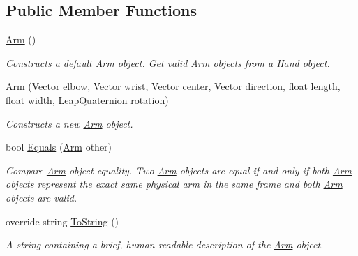 \subsection*{Public Member Functions}
\begin{DoxyCompactItemize}
\item 
\mbox{\hyperlink{class_leap_1_1_arm_ad59034da309d7065dd319774bb3907f3}{Arm}} ()
\begin{DoxyCompactList}\small\item\em Constructs a default \mbox{\hyperlink{class_leap_1_1_arm}{Arm}} object. Get valid \mbox{\hyperlink{class_leap_1_1_arm}{Arm}} objects from a \mbox{\hyperlink{class_leap_1_1_hand}{Hand}} object. \end{DoxyCompactList}\item 
\mbox{\hyperlink{class_leap_1_1_arm_a701ad9cfa92cdfdf206aaf5a43eaac43}{Arm}} (\mbox{\hyperlink{struct_leap_1_1_vector}{Vector}} elbow, \mbox{\hyperlink{struct_leap_1_1_vector}{Vector}} wrist, \mbox{\hyperlink{struct_leap_1_1_vector}{Vector}} center, \mbox{\hyperlink{struct_leap_1_1_vector}{Vector}} direction, float length, float width, \mbox{\hyperlink{struct_leap_1_1_leap_quaternion}{Leap\+Quaternion}} rotation)
\begin{DoxyCompactList}\small\item\em Constructs a new \mbox{\hyperlink{class_leap_1_1_arm}{Arm}} object. \end{DoxyCompactList}\item 
bool \mbox{\hyperlink{class_leap_1_1_arm_af18280f081e936d19487322bfdbe9134}{Equals}} (\mbox{\hyperlink{class_leap_1_1_arm}{Arm}} other)
\begin{DoxyCompactList}\small\item\em Compare \mbox{\hyperlink{class_leap_1_1_arm}{Arm}} object equality. Two \mbox{\hyperlink{class_leap_1_1_arm}{Arm}} objects are equal if and only if both \mbox{\hyperlink{class_leap_1_1_arm}{Arm}} objects represent the exact same physical arm in the same frame and both \mbox{\hyperlink{class_leap_1_1_arm}{Arm}} objects are valid. \end{DoxyCompactList}\item 
override string \mbox{\hyperlink{class_leap_1_1_arm_a0fe227fe0db934b12c47b51ac41c2cfc}{To\+String}} ()
\begin{DoxyCompactList}\small\item\em A string containing a brief, human readable description of the \mbox{\hyperlink{class_leap_1_1_arm}{Arm}} object. \end{DoxyCompactList}\end{DoxyCompactItemize}
